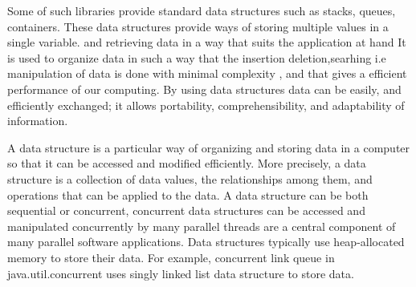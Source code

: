 Some of such libraries provide standard data structures such as stacks, queues, containers. These  data structures provide ways of storing multiple values in a single variable.
{and retrieving data in a way that suits the application at hand}
It is used to organize data in such a way that the insertion deletion,searhing i.e manipulation of data is done with minimal complexity , and that gives a efficient performance of our computing. 
By using data structures data can be easily, and efficiently exchanged; it allows portability, comprehensibility, and adaptability of information.

A data structure is a particular way of organizing and storing data in a computer so that it can be accessed and modified efficiently. More precisely, a data structure is a collection of data values, the relationships among them, and operations that can be applied to the data.
A data structure can be both sequential or concurrent, concurrent data structures can be accessed and manipulated concurrently by many parallel threads are a central component of many parallel software applications. 
Data structures typically use heap-allocated memory to store their data. For example, concurrent link queue in java.util.concurrent uses singly linked list data structure to store data. 



